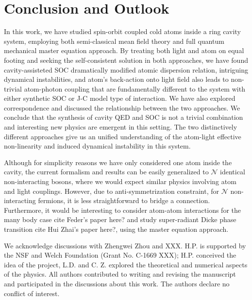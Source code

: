 \documentclass[atoms,article,submit,moreauthors,pdftex,12pt,a4paper]{mdpi}
\begin{document}
\section{Conclusion and Outlook} \label{conclusion}

In this work, we have studied spin-orbit coupled cold atoms inside a ring cavity system, employing both semi-classical mean field theory and full quantum mechanical master equation approach. By treating both light and atom on equal footing and seeking the self-consistent solution in both approaches, we have found cavity-assisteted SOC dramatically modified atomic dispersion relation, intriguing dynamical instabilities, and atom's back-action onto light field also leads to non-trivial atom-photon coupling that are fundamentally different to the system with either synthetic SOC or J-C model type of interaction. We have also explored correspondence and discussed the relationship between the two approaches. We conclude that the synthesis of cavity QED and SOC is not a trivial combination and interesting new physics are emergent in this setting. The two distinctively different approaches give us an uniﬁed understanding of the atom-light effective non-linearity and induced dynamical instability in this system. 

Although for simplicity reasons we have only considered one atom inside the cavity, the current formalism and results can be easily generalized to $\mathcal{N}$ identical non-interacting bosons, where we would expect similar physics involving atom and light couplings. However, due to anti-symmetrization constraint, for $\mathcal{N}$ non-interacting fermions, it is less straightforward to bridge a connection. Furthermore, it would be interesting to consider atom-atom interactions for the many body case {\color{red} cite Feder's paper here?} and study super-radiant Dicke phase transition {\color{red} cite Hui Zhai's paper here?}, using the master equation approach. 

We acknowledge discussions with Zhengwei Zhou and XXX. H.P. is supported by the NSF and Welch Foundation (Grant No. C-1669 XXX);
H.P. conceived the idea of the project, L.D. and C. Z. explored the theoretical and numerical aspects of the physics. All authors contributed to writing and revising the manuscript and participated in the discussions about this work.
The authors declare no conflict of interest. 
\end{document}
